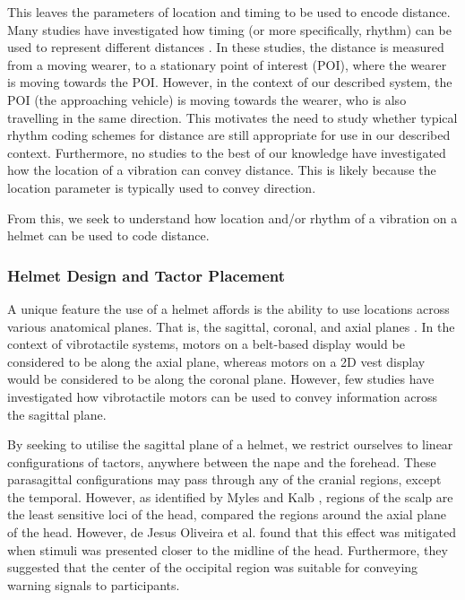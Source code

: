 \documentclass{interim}
\begin{document}
This leaves the parameters of location and timing to be used to encode distance. Many studies have investigated how timing (or more specifically, rhythm) can be used to represent different distances \cite{10.1145/1060581.1060585, 5326374, 10.1145/1520340.1520718, 10.1145/1753326.1753581, 10.1145/1868914.1868923}. In these studies, the distance is measured from a moving wearer, to a stationary point of interest (POI), where the wearer is moving towards the POI. However, in the context of our described system, the POI (the approaching vehicle) is moving towards the wearer, who is also travelling in the same direction. This motivates the need to study whether typical rhythm coding schemes for distance are still appropriate for use in our described context. Furthermore, no studies to the best of our knowledge have investigated how the location of a vibration can convey distance. This is likely because the location parameter is typically used to convey direction.

From this, we seek to understand how location and/or rhythm of a vibration on a helmet can be used to code distance.

\subsubsection{Helmet Design and Tactor Placement}\label{sec:helmet-design}
A unique feature the use of a helmet affords is the ability to use locations across various anatomical planes. That is, the sagittal, coronal, and axial planes \cite{anatomical}. In the context of vibrotactile systems, motors on a belt-based display \cite{10.1145/1613858.1613911, 10.1145/2449396.2449450, 10.1145/1060581.1060585} would be considered to be along the axial plane, whereas motors on a 2D vest display \cite{729547, 998954, van2000tactile} would be considered to be along the coronal plane. However, few studies have investigated how vibrotactile motors can be used to convey information across the sagittal plane.

By seeking to utilise the sagittal plane of a helmet, we restrict ourselves to linear configurations of tactors, anywhere between the nape and the forehead. These parasagittal configurations may pass through any of the cranial regions, except the temporal. However, as identified by Myles and Kalb \cite{headguidelines}, regions of the scalp are the least sensitive loci of the head, compared the regions around the axial plane of the head. However, de Jesus Oliveira et al. \cite{7463147} found that this effect was mitigated when stimuli was presented closer to the midline of the head. Furthermore, they suggested that the center of the occipital region was suitable for conveying warning signals to participants.
\end{document}
